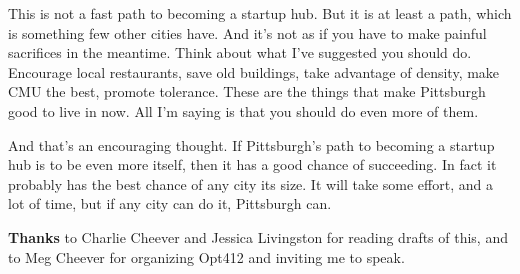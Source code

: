 This
                  is not a fast path to becoming a startup hub. But it is at
                  least a path, which is something few other cities have. And
                  it's not as if you have to make painful sacrifices in the
                  meantime. Think about what I've suggested you should do.
                  Encourage local restaurants, save old buildings, take
                  advantage of density, make CMU the best, promote tolerance.
                  These are the things that make Pittsburgh good to live in now.
                  All I'm saying is that you should do even more of them.

And
                  that's an encouraging thought. If Pittsburgh's path to
                  becoming a startup hub is to be even more itself, then it has
                  a good chance of succeeding. In fact it probably has the best
                  chance of any city its size. It will take some effort, and a
                  lot of time, but if any city can do it, Pittsburgh can.







\textbf{Thanks}
                  to Charlie Cheever and Jessica Livingston for reading drafts
                  of this, and to Meg Cheever for organizing Opt412 and inviting
                  me to speak.


              
            
          
            
              
                


                  
              
            
          
